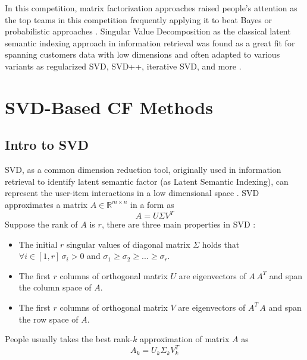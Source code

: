 \documentclass[letter paper, 11pt]{article}
\begin{document}
	
	In this competition, matrix factorization approaches raised people's attention as the top teams in this competition frequently applying it to beat Bayes or probabilistic approaches \cite{korenFactorization}. Singular Value Decomposition as the classical latent semantic indexing approach in information retrieval was found as a great fit for spanning customers data with low dimensions and often adapted to various variants as regularized SVD, SVD++, iterative SVD, and more \cite{gower} \cite{SVD++performance} \cite{contextual} \cite{korenFactorization}. 
		
	
	
	\section{SVD-Based CF Methods}
	\subsection{Intro to SVD}
		SVD, as a common dimension reduction tool, originally used in information retrieval to identify latent semantic factor (as Latent Semantic Indexing), can represent the user-item interactions in a low dimensional space \cite{MFinRS} \cite{ApplySVD}. SVD approximates a matrix $A \in \mathbb{R}^{m \times n}$ in a form as 
	\begin{equation}
		A = U \Sigma V^T
	\end{equation}
	Suppose the rank of $A$ is $r$, there are three main properties in SVD\cite{ApplySVD} \cite{gower}:
	\begin{itemize}
		\item 
		The initial $r$ singular values of diagonal matrix $\Sigma$ holds that $\forall i \in [1, r]\,\sigma_i > 0$ and $\sigma_1 \geq \sigma_2 \geq ... \geq \sigma_r$.
		
		\item 
		The first $r$ columns of orthogonal matrix $U$ are eigenvectors of $A\,A^T$ and span the column space of $A$.
		
		\item
		The first $r$ columns of orthogonal matrix $V$ are eigenvectors of $A^T\,A$ and span the row space of $A$.
	\end{itemize}
	
	People usually takes the best rank-$k$ approximation of matrix $A$ as 
	\begin{equation} \label{trun-SVD}
		A_k = U_k \Sigma_k V_k^T
	\end{equation}
	
\end{document}
